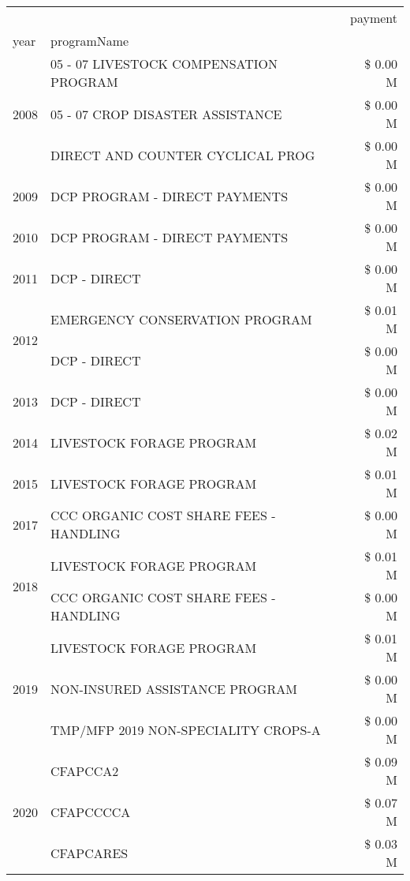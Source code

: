 \begin{tabular}{llr}
\toprule
 &  & payment \\
year & programName &  \\
\midrule
\multirow[t]{3}{*}{2008} & 05 - 07 LIVESTOCK COMPENSATION PROGRAM & \$ 0.00 M \\
 & 05 - 07 CROP DISASTER ASSISTANCE & \$ 0.00 M \\
 & DIRECT AND COUNTER CYCLICAL PROG & \$ 0.00 M \\
\cline{1-3}
2009 & DCP PROGRAM - DIRECT PAYMENTS & \$ 0.00 M \\
\cline{1-3}
2010 & DCP PROGRAM - DIRECT PAYMENTS & \$ 0.00 M \\
\cline{1-3}
2011 & DCP - DIRECT & \$ 0.00 M \\
\cline{1-3}
\multirow[t]{2}{*}{2012} & EMERGENCY CONSERVATION PROGRAM & \$ 0.01 M \\
 & DCP - DIRECT & \$ 0.00 M \\
\cline{1-3}
2013 & DCP - DIRECT & \$ 0.00 M \\
\cline{1-3}
2014 & LIVESTOCK FORAGE PROGRAM & \$ 0.02 M \\
\cline{1-3}
2015 & LIVESTOCK FORAGE PROGRAM & \$ 0.01 M \\
\cline{1-3}
2017 & CCC ORGANIC COST SHARE FEES - HANDLING & \$ 0.00 M \\
\cline{1-3}
\multirow[t]{2}{*}{2018} & LIVESTOCK FORAGE PROGRAM & \$ 0.01 M \\
 & CCC ORGANIC COST SHARE FEES - HANDLING & \$ 0.00 M \\
\cline{1-3}
\multirow[t]{3}{*}{2019} & LIVESTOCK FORAGE PROGRAM & \$ 0.01 M \\
 & NON-INSURED ASSISTANCE PROGRAM & \$ 0.00 M \\
 & TMP/MFP 2019 NON-SPECIALITY CROPS-A & \$ 0.00 M \\
\cline{1-3}
\multirow[t]{3}{*}{2020} & CFAPCCA2 & \$ 0.09 M \\
 & CFAPCCCCA & \$ 0.07 M \\
 & CFAPCARES & \$ 0.03 M \\
\cline{1-3}
\bottomrule
\end{tabular}
